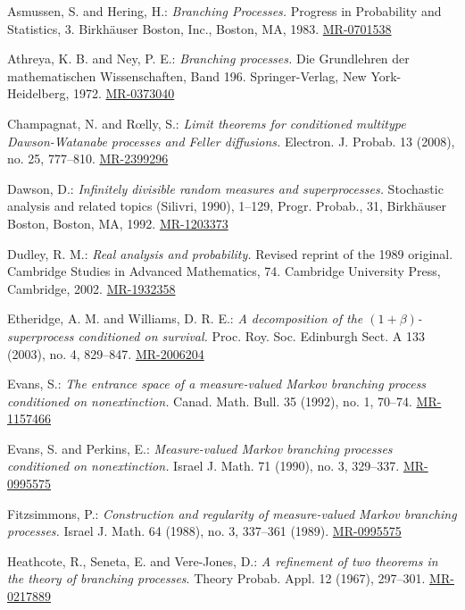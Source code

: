 \documentclass[12pt,a4paper]{amsart}
\numberwithin{equation}{section}
\theoremstyle{plain}
\theoremstyle{definition}
\theoremstyle{remark}
\def\MR#1{\href{http://www.ams.org/mathscinet-getitem?mr=#1}{MR-#1}}
\begin{document}
\begin{thebibliography}{99}

	Asmussen, S. and Hering, H.:
	\emph{Branching Processes.}
	Progress in Probability and Statistics, 3. Birkh\"auser Boston, Inc., Boston, MA, 1983.
	\MR{0701538}

	Athreya, K. B. and Ney, P. E.:
	\emph{Branching processes.}
	Die Grundlehren der mathematischen Wissenschaften, Band 196. Springer-Verlag, New York-Heidelberg, 1972.
	\MR{0373040}
	
	Champagnat, N. and R{\oe}lly, S.:
	\emph{Limit theorems for conditioned multitype Dawson-Watanabe processes and Feller diffusions.}
	Electron. J. Probab. 13 (2008), no. 25, 777--810.
	\MR{2399296}

	Dawson, D.:
	\emph{Infinitely divisible random measures and superprocesses.}
	Stochastic analysis and related topics (Silivri, 1990), 1--129, Progr. Probab., 31, Birkh\"auser Boston, Boston, MA, 1992.
	\MR{1203373}
	
	Dudley, R. M.:
	\emph{Real analysis and probability.}
	Revised reprint of the 1989 original. Cambridge Studies in Advanced Mathematics, 74. Cambridge University Press, Cambridge, 2002.
	\MR{1932358}
	
	Etheridge, A. M. and Williams, D. R. E.:
	\emph{A decomposition of the $(1+\beta)$-superprocess conditioned on survival.}
	Proc. Roy. Soc. Edinburgh Sect. A 133 (2003), no. 4, 829--847.
	\MR{2006204}
	
	Evans, S.:
	\emph{The entrance space of a measure-valued Markov branching process conditioned on nonextinction.}
	Canad. Math. Bull. 35 (1992), no. 1, 70--74.
	\MR{1157466}
	
	Evans, S. and Perkins, E.:
	\emph{Measure-valued Markov branching processes conditioned on nonextinction.}
	Israel J. Math. 71 (1990), no. 3,
	329--337.
	\MR{0995575}
	
	Fitzsimmons, P.:
	\emph{Construction and regularity of measure-valued Markov branching processes.}
	Israel J. Math. 64 (1988), no. 3, 337--361 (1989).
	\MR{0995575}

	Heathcote, R.,  Seneta, E.  and Vere-Jones, D.:
	\emph{A refinement of two theorems in the theory of branching processes}.
	Theory Probab. Appl. 12 (1967), 297--301.
	\MR{0217889}


\end{thebibliography}
\end{document}
